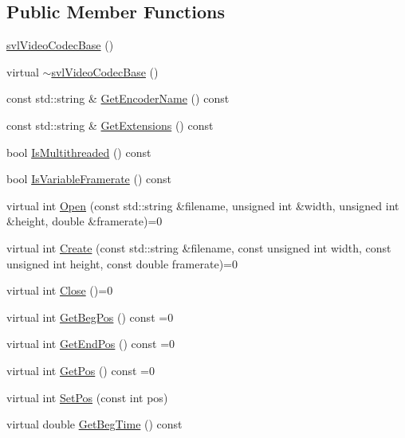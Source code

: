 \subsection*{Public Member Functions}
\begin{DoxyCompactItemize}
\item 
\hyperlink{classsvl_video_codec_base_a3945c8c1e62bf8e1de6500592963627c}{svl\+Video\+Codec\+Base} ()
\item 
virtual \hyperlink{classsvl_video_codec_base_a94ba1a1a76beeaddb5f9617aac89e482}{$\sim$svl\+Video\+Codec\+Base} ()
\item 
const std\+::string \& \hyperlink{classsvl_video_codec_base_afff04477c71dbc08410c8dcc4bcec8dd}{Get\+Encoder\+Name} () const 
\item 
const std\+::string \& \hyperlink{classsvl_video_codec_base_a536465ea89b94df203b6125a9a04f754}{Get\+Extensions} () const 
\item 
bool \hyperlink{classsvl_video_codec_base_abbbfcea9dd4009f734b279b1546e0835}{Is\+Multithreaded} () const 
\item 
bool \hyperlink{classsvl_video_codec_base_ab8e4b7ef187db972741336d055ee697c}{Is\+Variable\+Framerate} () const 
\item 
virtual int \hyperlink{classsvl_video_codec_base_a478f865232f8c6fa67fcfdb0b92c6991}{Open} (const std\+::string \&filename, unsigned int \&width, unsigned int \&height, double \&framerate)=0
\item 
virtual int \hyperlink{classsvl_video_codec_base_a388195458d91ca407c01e42d1a54fd7c}{Create} (const std\+::string \&filename, const unsigned int width, const unsigned int height, const double framerate)=0
\item 
virtual int \hyperlink{classsvl_video_codec_base_a06119b490cb63be4f123c33abb696843}{Close} ()=0
\item 
virtual int \hyperlink{classsvl_video_codec_base_a88437c6468abbf0631c4cfa4a18c9231}{Get\+Beg\+Pos} () const =0
\item 
virtual int \hyperlink{classsvl_video_codec_base_a9d41fc01ce87a9a0fb871cd869a581c8}{Get\+End\+Pos} () const =0
\item 
virtual int \hyperlink{classsvl_video_codec_base_a6e74b3fb8404c8f2a0b31c164d19cbfa}{Get\+Pos} () const =0
\item 
virtual int \hyperlink{classsvl_video_codec_base_a57123281dfbc3374d4a7fca5bc85cf45}{Set\+Pos} (const int pos)
\item 
virtual double \hyperlink{classsvl_video_codec_base_a5b709baf483a616d49a9f33ffe7f970b}{Get\+Beg\+Time} () const 

\end{DoxyCompactItemize}
